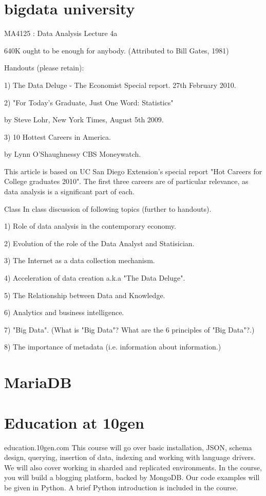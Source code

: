 \section{bigdata university}
MA4125 : Data Analysis Lecture 4a
  
    640K ought to be enough for anybody. (Attributed to Bill Gates, 1981)
 
Handouts (please retain):
 
1) The Data Deluge - The Economist Special report. 27th February 2010. 
 
2) "For Today's Graduate, Just One Word: Statistics"
    
    by Steve Lohr, New York Times, August 5th 2009. 
 
3) 10 Hottest Careers in America.
 
    by Lynn O'Shaughnessy CBS Moneywatch.
 
This article is based on UC San Diego Extension's special report "Hot Careers for College graduates 2010". The first three careers are of particular relevance, as data analysis is a significant part of each.

Class
In class discussion of following topics (further to handouts).
 
1) Role of data analysis in the contemporary economy.
 
 
 
2) Evolution of the role of the Data Analyst and Statisician.
 
 
 
3) The Internet as a data collection mechanism.
 
 
 
4) Acceleration of data creation a.k.a "The Data Deluge".
 
 
 
5) The Relationship between Data and Knowledge.
 
 
 
6) Analytics and business intelligence.
 
 
 
7) "Big Data". (What is "Big Data"? What are the 6 principles of "Big Data"?.)
 
 
 
8) The importance of metadata (i.e. information about information.)
\section{MariaDB}

\section{Education at 10gen}
education.10gen.com
This course will go over basic installation, JSON, schema design, querying, insertion of data, indexing and working with language drivers. We will also cover working in sharded and replicated environments. In the course, you will build a blogging platform, backed by MongoDB. Our code examples will be given in Python. A brief Python introduction is included in the course. 


